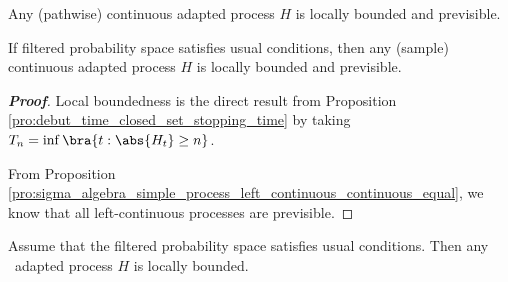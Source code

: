 
\begin{proposition}\label{pro:continuous_adapted_process_is_locally_bounded_previsible}
Any (pathwise) continuous adapted process $H$ is locally bounded and previsible.

If filtered probability space satisfies usual conditions, then any (sample) continuous adapted process $H$ is locally bounded and previsible.
\end{proposition}

\begin{proof}[\bf Proof]
Local boundedness is the direct result from Proposition \ref{pro:debut_time_closed_set_stopping_time} by taking $T_n = \inf\bra{t:\abs{H_t}\geq n}$. %

From Proposition \ref{pro:sigma_algebra_simple_process_left_continuous_continuous_equal}, we know that all left-continuous processes are previsible.
\end{proof}





\begin{proposition}\label{pro:right_continuous_adapted_process_is_locally_bounded_usual_conditions}
Assume that the filtered probability space satisfies usual conditions. Then any \cadlag\ adapted process $H$ is locally bounded.
\end{proposition}

